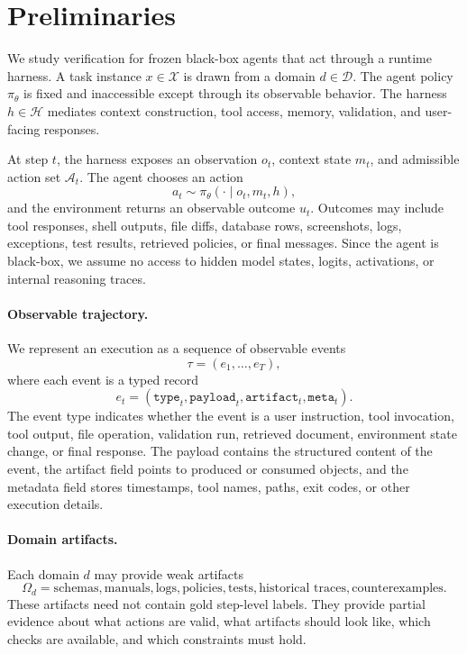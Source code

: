 \documentclass{article} %
\begin{document}
\section{Preliminaries}
\label{sec:preliminaries}

We study verification for frozen black-box agents that act through a runtime harness. A task instance $x \in \mathcal{X}$ is drawn from a domain $d \in \mathcal{D}$. The agent policy $\pi_\theta$ is fixed and inaccessible except through its observable behavior. The harness $h \in \mathcal{H}$ mediates context construction, tool access, memory, validation, and user-facing responses.

At step $t$, the harness exposes an observation $o_t$, context state $m_t$, and admissible action set $\mathcal{A}_t$. The agent chooses an action
\begin{equation}
a_t \sim \pi_\theta(\cdot \mid o_t, m_t, h),
\end{equation}
and the environment returns an observable outcome $u_t$. Outcomes may include tool responses, shell outputs, file diffs, database rows, screenshots, logs, exceptions, test results, retrieved policies, or final messages. Since the agent is black-box, we assume no access to hidden model states, logits, activations, or internal reasoning traces.

\paragraph{Observable trajectory.}
We represent an execution as a sequence of observable events
\begin{equation}
\tau = (e_1,\ldots,e_T),
\end{equation}
where each event is a typed record
\begin{equation}
e_t = (\texttt{type}_t,\texttt{payload}_t,\texttt{artifact}_t,\texttt{meta}_t).
\end{equation}
The event type indicates whether the event is a user instruction, tool invocation, tool output, file operation, validation run, retrieved document, environment state change, or final response. The payload contains the structured content of the event, the artifact field points to produced or consumed objects, and the metadata field stores timestamps, tool names, paths, exit codes, or other execution details.

\paragraph{Domain artifacts.}
Each domain $d$ may provide weak artifacts
\begin{equation}
\Omega_d =
{\text{schemas}, \text{manuals}, \text{logs}, \text{policies}, \text{tests}, \text{historical traces}, \text{counterexamples}}.
\end{equation}
These artifacts need not contain gold step-level labels. They provide partial evidence about what actions are valid, what artifacts should look like, which checks are available, and which constraints must hold.
\end{document}
